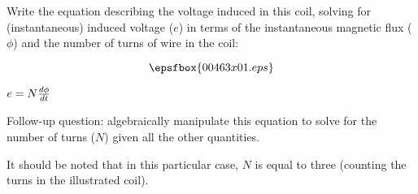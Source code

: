 

Write the equation describing the voltage induced in this coil, solving for (instantaneous) induced voltage ($e$) in terms of the instantaneous magnetic flux ($\phi$) and the number of turns of wire in the coil:

$$\epsfbox{00463x01.eps}$$







$e = N{d\phi \over dt}$

\vskip 10pt

Follow-up question: algebraically manipulate this equation to solve for the number of turns ($N$) given all the other quantities.







It should be noted that in this particular case, $N$ is equal to three (counting the turns in the illustrated coil).




